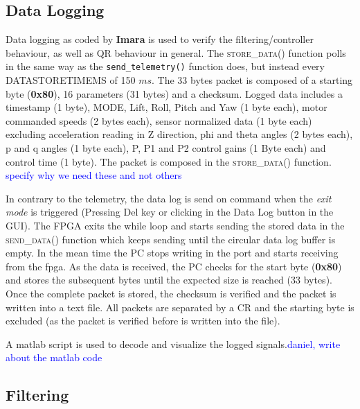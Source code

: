 \documentclass{article}
\newcommand\todo[1]{\textcolor{blue}{#1}} %
\begin{document}
\subsection{Data Logging}

Data logging as coded by \textbf{Imara} is used to verify the filtering/controller behaviour, as well as QR behaviour in general. The \textsc{store\_data()} function polls in the same way as the \texttt{send\_telemetry()} function does, but instead every \textsc{DATASTORETIMEMS} of 150 $ms$. The 33 bytes packet is composed of a starting byte (\textbf{0x80}), 16 parameters (31 bytes) and a checksum. Logged data includes a timestamp (1 byte), MODE, Lift, Roll, Pitch and Yaw (1 byte each), motor commanded speeds (2 bytes each), sensor normalized data (1 byte each) excluding acceleration reading in Z direction, phi and theta angles (2 bytes each), p and q angles (1 byte each), P, P1 and P2 control gains (1 Byte each) and control time (1 byte). The packet is composed in the \textsc{store\_data()} function. \todo{specify why we need these and not others}

In contrary to the telemetry, the data log is send on command when the \emph{exit mode} is triggered (Pressing Del key or clicking in the Data Log button in the GUI). The FPGA exits the while loop and starts sending the stored data in the \textsc{send\_data()} function which keeps sending until the circular data log buffer is empty. In the mean time the PC stops writing in the port and starts receiving from the fpga. As the data is received, the PC checks for the start byte (\textbf{0x80}) and stores the subsequent bytes until the expected size is reached (33 bytes). Once the complete packet is stored, the checksum is verified and the packet is written into a text file. All packets are separated by a CR and the starting byte is excluded (as the packet is verified before is written into the file).

A matlab script is used to decode and visualize the logged signals.\todo{daniel, write about the matlab code}


\subsection{Filtering}
\label{sec:filtering}
\end{document}
